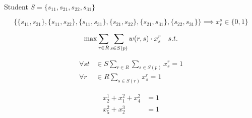 \documentclass[12pt]{article}
\begin{document}
\\
Student $S=\{s_{11}, s_{21}, s_{22},s_{31}\}$




\begin{equation*}
\{\{s_{11}, s_{21}\}, \{s_{11},s_{22}\},\{s_{11},s_{31}\},  \{s_{21},s_{22}\}, \{s_{21},s_{31}\},  \{s_{22},s_{31}\} \}\implies x_r^s \in \{0, 1\}
\end{equation*}

\begin{equation*}
\max\sum_{r\in{R}}\sum_{s\in{S(p)}}w(r,s)\cdot{x_s^r}\quad{s.t.}\\
\end{equation*}

\begin{align*}
\forall{st}&\in{S}\sum_{r\in{R}}\sum_{s\in{S(p)}}x_s^r=1\\
\forall{r}&\in{R}\sum_{s\in{S(r)}}x_s^r=1
\end{align*}


\begin{align*}
x_2^1+x_1^2+x_4^2&=1\\
x_5^2+x_2^3&=1\\
\end{align*}
\end{document}
